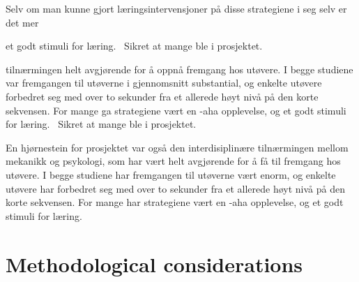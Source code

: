 Selv om man kunne gjort læringsintervensjoner på disse strategiene i seg selv er det mer 








et godt stimuli for læring.  Sikret at mange ble i prosjektet.  



tilnærmingen helt avgjørende for å oppnå fremgang hos utøvere. I begge studiene var fremgangen til utøverne i gjennomsnitt substantial, og enkelte utøvere forbedret seg med over to sekunder fra et allerede høyt nivå på den korte sekvensen. For mange ga strategiene vært en -aha opplevelse, og et godt stimuli for læring.  Sikret at mange ble i prosjektet. 




En hjørnestein for prosjektet var også den interdisiplinære tilnærmingen mellom mekanikk og psykologi, som har vært helt avgjørende for å få til fremgang hos utøvere. I begge studiene har fremgangen til utøverne vært enorm, og enkelte utøvere har forbedret seg med over to sekunder fra et allerede høyt nivå på den korte sekvensen. For mange har strategiene vært en -aha opplevelse, og et godt stimuli for læring. 




\section{Methodological considerations}



